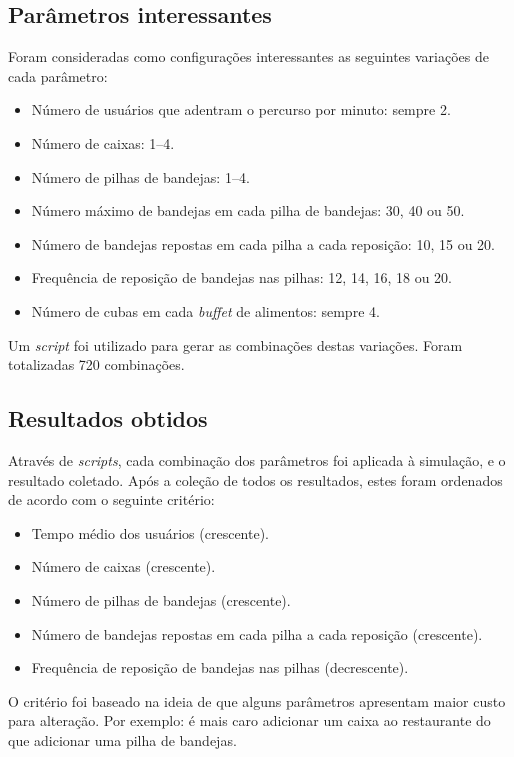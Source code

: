 \documentclass{article}
\begin{document}
\subsection{Parâmetros interessantes}
Foram consideradas como configurações interessantes as seguintes variações de cada parâmetro:
\begin{itemize}
  \setlength\itemsep{0px}
  \item Número de usuários que adentram o percurso por minuto: sempre 2.
  \item Número de caixas: 1--4.
  \item Número de pilhas de bandejas: 1--4.
  \item Número máximo de bandejas em cada pilha de bandejas: 30, 40 ou 50.
  \item Número de bandejas repostas em cada pilha a cada reposição: 10, 15 ou 20.
  \item Frequência de reposição de bandejas nas pilhas: 12, 14, 16, 18 ou 20.
  \item Número de cubas em cada \textit{buffet} de alimentos: sempre 4.
\end{itemize}
Um \textit{script} foi utilizado para gerar as combinações destas variações. Foram totalizadas 720 combinações.

\pagebreak

\subsection{Resultados obtidos}
Através de \textit{scripts}, cada combinação dos parâmetros foi aplicada à simulação, e o resultado coletado. Após a coleção de todos os resultados, estes foram ordenados de acordo com o seguinte critério:
\begin{itemize}
  \setlength\itemsep{0px}
  \item Tempo médio dos usuários (crescente).
  \item Número de caixas (crescente).
  \item Número de pilhas de bandejas (crescente).
  \item Número de bandejas repostas em cada pilha a cada reposição (crescente).
  \item Frequência de reposição de bandejas nas pilhas (decrescente).
\end{itemize}
O critério foi baseado na ideia de que alguns parâmetros apresentam maior custo para alteração. Por exemplo: é mais caro adicionar um caixa ao restaurante do que adicionar uma pilha de bandejas.
\end{document}
